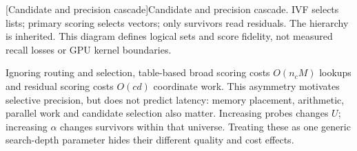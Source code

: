 \par\medskip\noindent\begin{minipage}{\linewidth}
\centering\captionsetup{hypcap=false}
\resizebox{\linewidth}{!}{}
[Candidate and precision cascade]{Candidate and precision cascade. IVF selects lists;
primary scoring selects vectors; only survivors read residuals. The hierarchy
is inherited. This diagram defines logical sets and score fidelity,
not measured recall losses or GPU kernel boundaries.}
\label{fig:2-cascade}
\end{minipage}\par\medskip

Ignoring routing and selection, table-based broad scoring costs
$O(n_cM)$ lookups and residual scoring costs $O(cd)$ coordinate work.
This asymmetry motivates selective precision, but does not predict latency:
memory placement, arithmetic, parallel work and candidate selection also
matter. Increasing probes changes $U$; increasing $\alpha$ changes survivors
within that universe. Treating these as one generic search-depth parameter
hides their different quality and cost effects.
